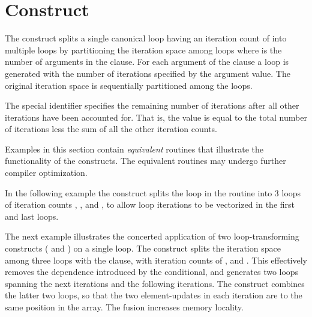\section{ Construct}
\label{sec:split}



The  construct splits a single canonical loop having an iteration
count of  into
multiple loops by partitioning the iteration space among  loops
where  is the number of arguments in the  clause.
For each argument of the  clause a loop is 
generated with the number of iterations specified by the argument value.
The original iteration space is sequentially partitioned among the loops.

The special  identifier specifies
the remaining number of iterations after all other iterations have been accounted for.
That is, the  value is equal to the total number of iterations less the
sum of all the other iteration counts.

Examples in this section contain \emph{equivalent}
routines that illustrate the functionality of the constructs. 
The equivalent routines may undergo further compiler optimization.

In the following example the  construct splits the loop
in the  routine
into 3 loops of iteration counts , , and
, to allow loop iterations to be vectorized in the first and last loops.


The next example illustrates the concerted application
of two loop-transforming constructs ( and )
on a single loop. The  construct splits the iteration
space among three loops with the  clause,
with iteration counts of ,  and . This effectively removes the
dependence introduced by the  conditional, and generates
two loops spanning the next  iterations and the following  iterations.
The  construct combines the latter two
loops, so that the two element-updates in each iteration are to the same
position in the array. The fusion increases memory locality.

